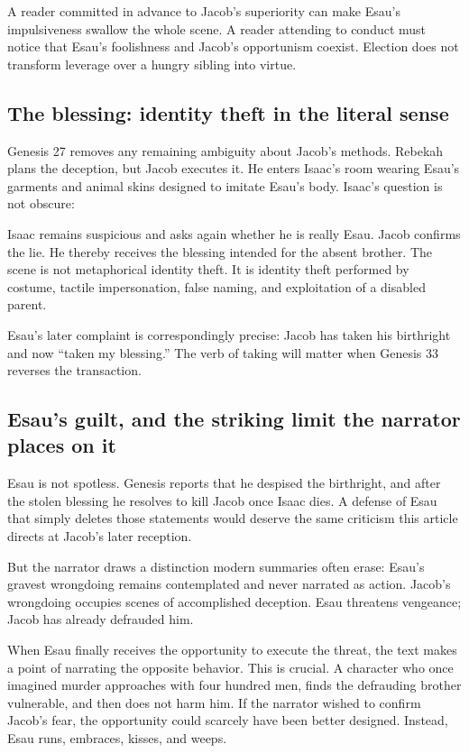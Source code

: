 A reader committed in advance to Jacob's superiority can make Esau's impulsiveness swallow the whole scene. A reader attending to conduct must notice that Esau's foolishness and Jacob's opportunism coexist. Election does not transform leverage over a hungry sibling into virtue.

\subsection{The blessing: identity theft in the literal sense}

Genesis 27 removes any remaining ambiguity about Jacob's methods. Rebekah plans the deception, but Jacob executes it. He enters Isaac's room wearing Esau's garments and animal skins designed to imitate Esau's body. Isaac's question is not obscure:


Isaac remains suspicious and asks again whether he is really Esau. Jacob confirms the lie. He thereby receives the blessing intended for the absent brother. The scene is not metaphorical identity theft. It is identity theft performed by costume, tactile impersonation, false naming, and exploitation of a disabled parent.

Esau's later complaint is correspondingly precise: Jacob has taken his birthright and now ``taken my blessing.'' The verb of taking will matter when Genesis 33 reverses the transaction.

\subsection{Esau's guilt, and the striking limit the narrator places on it}

Esau is not spotless. Genesis reports that he despised the birthright, and after the stolen blessing he resolves to kill Jacob once Isaac dies. A defense of Esau that simply deletes those statements would deserve the same criticism this article directs at Jacob's later reception.

But the narrator draws a distinction modern summaries often erase: Esau's gravest wrongdoing remains contemplated and never narrated as action. Jacob's wrongdoing occupies scenes of accomplished deception. Esau threatens vengeance; Jacob has already defrauded him.

When Esau finally receives the opportunity to execute the threat, the text makes a point of narrating the opposite behavior. This is crucial. A character who once imagined murder approaches with four hundred men, finds the defrauding brother vulnerable, and then does not harm him. If the narrator wished to confirm Jacob's fear, the opportunity could scarcely have been better designed. Instead, Esau runs, embraces, kisses, and weeps.

